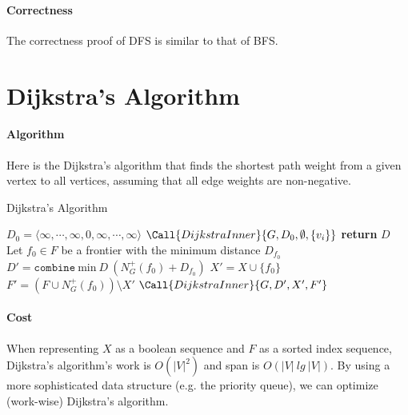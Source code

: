 \documentclass[11pt,a4paper,oneside,microtype,chapter,nokorean]{oblivoir}
\begin{document}
\paragraph{Correctness} The correctness proof of DFS is similar to that of BFS.



\section{Dijkstra's Algorithm}

\paragraph{Algorithm}

Here is the Dijkstra's algorithm that finds the shortest path weight from a given vertex to all
vertices, assuming that all edge weights are non-negative.


\begin{algorithm}
  \caption{Dijkstra's Algorithm}\label{dijkstra}
  \begin{algorithmic}[1]
     
    \State $D_0 = \langle \infty, \cdots, \infty, 0, \infty, \cdots, \infty \rangle$ 
    \State $\Call{DijkstraInner}{G,D_0,\emptyset,\{v_i\}}$
    \EndProcedure
    \Statex
     
    \State \textbf{return} $D$
    \EndIf
    \State Let $f_0 \in F$ be a frontier with the minimum distance $D_{f_0}$
    \State $D' = \texttt{combine}~\textrm{min}~D~(N^+_G(f_0) + D_{f_0})$ 
    \State $X' = X \cup \{f_0\}$
    \State $F' = (F \cup N^+_G(f_0)) \setminus X'$
    \State $\Call{DijkstraInner}{G,D',X',F'}$
    \EndProcedure
  \end{algorithmic}
\end{algorithm}


\paragraph{Cost}

When representing $X$ as a boolean sequence and $F$ as a sorted index sequence, Dijkstra's
algorithm's work is $O(|V|^2)$ and span is $O(|V|~lg~|V|)$.  By using a more sophisticated data
structure (e.g. the priority queue), we can optimize (work-wise) Dijkstra's algorithm.
\end{document}
